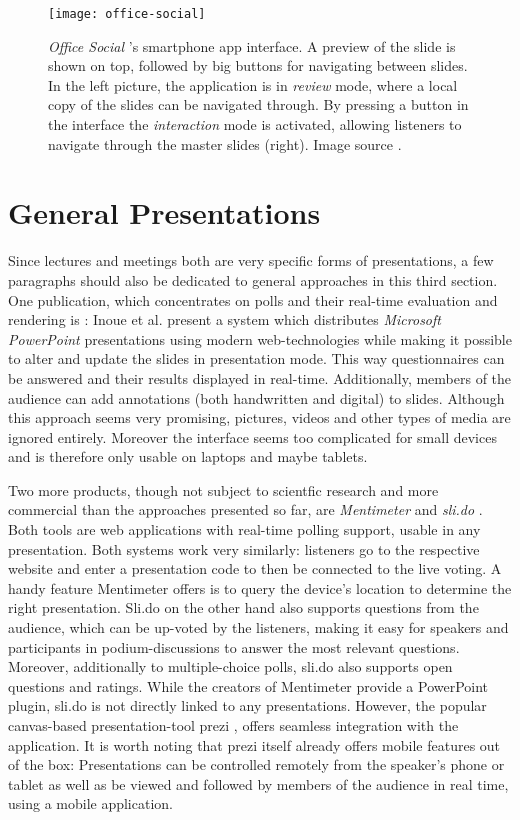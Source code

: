 \begin{figure}
\centering
\texttt{[image: office-social]}
\caption{\emph{Office Social} \cite{Chattopadhyay:OfficeSocialRemoteControl}'s smartphone app interface. A preview of the slide is shown on top, followed by big buttons for navigating between slides. In the left picture, the application is in \emph{review} mode, where a local copy of the slides can be navigated through. By pressing a button in the interface the \emph{interaction} mode is activated, allowing listeners to navigate through the master slides (right). Image source \cite{Chattopadhyay:OfficeSocialRemoteControl}.}
\label{fig:related-work-office-social}
\end{figure}

\section{General Presentations}
\label{sec:related-work-general}
Since lectures and meetings both are very specific forms of presentations, a few paragraphs should also be dedicated to general approaches in this third section.
One publication, which concentrates on polls and their real-time evaluation and rendering is \cite{Inoue:RealTimeQuestionnaire}: Inoue et al. present a system which distributes \emph{Microsoft PowerPoint} presentations using modern web-technologies while making it possible to alter and update the slides in presentation mode. This way questionnaires can be answered and their results displayed in real-time. Additionally, members of the audience can add annotations (both handwritten and digital) to slides. Although this approach seems very promising, pictures, videos and other types of media are ignored entirely. Moreover the interface seems too complicated for small devices and is therefore only usable on laptops and maybe tablets.

Two more products, though not subject to scientfic research and more commercial than the approaches presented so far, are \emph{Mentimeter} \cite{mentimeter} and \emph{sli.do} \cite{slido}. Both tools are web applications with real-time polling support, usable in any presentation. Both systems work very similarly: listeners go to the respective website and enter a presentation code to then be connected to the live voting. A handy feature Mentimeter offers is to query the device's location to determine the right presentation. Sli.do on the other hand also supports questions from the audience, which can be up-voted by the listeners, making it easy for speakers and participants in podium-discussions to answer the most relevant questions. Moreover, additionally to multiple-choice polls, sli.do also supports open questions and ratings. While the creators of Mentimeter provide a PowerPoint plugin, sli.do is not directly linked to any presentations. However, the popular canvas-based presentation-tool prezi \cite{prezi}, offers seamless integration with the application. It is worth noting that prezi itself already offers mobile features out of the box: Presentations can be controlled remotely from the speaker's phone or tablet as well as be viewed and followed by members of the audience in real time, using a mobile application.


